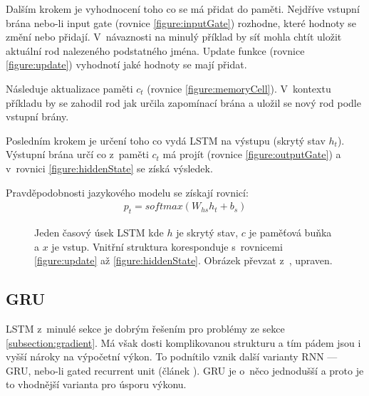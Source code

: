 Dalším krokem je vyhodnocení toho co se má přidat do paměti. Nejdříve vstupní brána nebo-li input gate (rovnice \ref{figure:inputGate}) rozhodne, které hodnoty se změní nebo přidají. V~návaznosti na minulý příklad by síť mohla chtít uložit aktuální rod nalezeného podstatného jména. Update funkce (rovnice \ref{figure:update}) vyhodnotí jaké hodnoty se mají přidat.

Následuje aktualizace paměti $c_t$ (rovnice \ref{figure:memoryCell}). V~kontextu příkladu by se zahodil rod jak určila zapomínací brána a uložil se nový rod podle vstupní brány.

Posledním krokem je určení toho co vydá LSTM na výstupu (skrytý stav $h_t$). Výstupní brána určí co z~paměti $c_t$ má projít (rovnice \ref{figure:outputGate}) a v~rovnici \ref{figure:hiddenState} se získá výsledek.

Pravděpodobnosti jazykového modelu se získají rovnicí:
\begin{align}
    p_t = softmax(W_{hs}h_{t} + b_{s})
\end{align}


\begin{figure}[H]
    \begin{center}
    \end{center}
	\caption{Jeden časový úsek LSTM kde $h$ je skrytý stav, $c$ je paměťová buňka a $x$ je vstup. Vnitřní struktura koresponduje s~rovnicemi \ref{figure:update} až \ref{figure:hiddenState}. Obrázek převzat z~\cite{understandingLSTM}, upraven.}
	\label{img:LSTM}
\end{figure}



\subsection{GRU}\label{section:GRU}
LSTM z~minulé sekce je dobrým řešením pro problémy ze sekce \ref{subsection:gradient}. Má však dosti komplikovanou strukturu a tím pádem jsou i vyšší nároky na výpočetní výkon. To podnítilo vznik další varianty RNN --- GRU, nebo-li gated recurrent unit (článek \cite{GRU}). GRU je o~něco jednodušší a proto je to vhodnější varianta pro úsporu výkonu.

